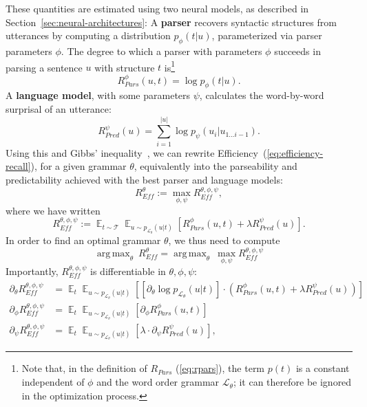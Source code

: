 \documentclass[10pt,twoside,lineno]{article}
\DeclareMathOperator*{\argmax}{arg\,max}
\DeclareMathOperator{\E}{\mathop{\mathbb{E}}}
\newcommand{\key}[1]{\textbf{#1}}
\begin{document}
These quantities are estimated using two neural models, as described in Section~\ref{sec:neural-architectures}:
A \key{parser} recovers syntactic structures from utterances by computing a distribution $p_\phi(t|u)$, parameterized via parser parameters $\phi$.
The degree to which a parser with parameters $\phi$ succeeds in parsing a sentence $u$ with structure $t$ is\footnote{Note that, in the definition of $R_{Pars}$ (\ref{eq:rpars}), the term $p(t)$ is a constant independent of $\phi$ and the word order grammar $\mathcal{L}_\theta$; it can therefore be ignored in the optimization process.} 
\begin{equation}
	R_{Pars}^{\phi}(u,t) =  \log p_\phi(t|u).
\end{equation}
A \key{language model}, with some parameters $\psi$, calculates the word-by-word surprisal of an utterance:
\begin{equation}
	R_{Pred}^{\psi}(u) = \sum_{i=1}^{|u|} \log p_\psi(u_i|u_{1\dots i-1}).
\end{equation}
Using this and Gibbs' inequality~\cite{cover2006elements}, we can rewrite Efficiency~(\ref{eq:efficiency-recall}), for a given grammar $\theta$, equivalently into the parseability and predictability achieved with the best parser and language models:
\begin{equation}
	R_{\textit{Eff}}^{\theta} := \max_{\phi,\psi} R_{\textit{Eff}}^{\theta, \phi, \psi},
\end{equation}\label{eq:efficiency-rewrite}
where we have written
\begin{equation}
R_{\textit{Eff}}^{\theta, \phi, \psi} := \E_{t \sim \mathcal{T}} \E_{u \sim p_{\mathcal{L}_\theta}(u|t)} \left[R_{Pars}^{\phi}(u,t) + \lambda R_{Pred}^{\psi}(u)\right].
\end{equation}
In order to find an optimal grammar $\theta$, we thus need to compute 
\begin{equation}\label{eq:efficiency}
\argmax_\theta\	R_{\textit{Eff}}^{\theta} = \argmax_\theta\	\max_{\phi, \psi} R_{\textit{Eff}}^{\theta, \phi, \psi} 
\end{equation}
Importantly, $R_{\textit{Eff}}^{\theta, \phi, \psi}$ is differentiable in $\theta, \phi, \psi$: %
\begin{align}
\partial_\theta R_{\textit{Eff}}^{\theta, \phi, \psi} &= \E_t \E_{u \sim p_{\mathcal{L}_\theta}(u|t)} \left[  \left[\partial_\theta \log p_{\mathcal{L}_\theta}(u|t)\right] \cdot    \left(R_{Pars}^{\phi}(u,t) + \lambda R_{Pred}^{\psi}(u)\right) \right] \label{eq:dtheta}\\ 
\partial_\phi R_{\textit{Eff}}^{\theta, \phi, \psi} &= \E_t \E_{u \sim p_{\mathcal{L}_\theta}(u|t)}  \left[\partial_\phi R_{Pars}^{\phi}(u,t)\right] \\
\partial_\psi R_{\textit{Eff}}^{\theta, \phi, \psi} &= \E_t \E_{u \sim p_{\mathcal{L}_\theta}(u|t)}  \left[\lambda \cdot \partial_\psi R_{Pred}^{\psi}(u)\right] \label{eq:dpsi},
\end{align}
\end{document}
